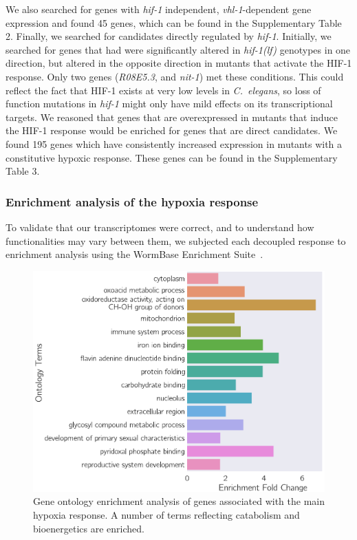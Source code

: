 \documentclass[10pt, onecolumn]{article}
\newcommand{\cel}{\emph{C.~elegans}}
\newcommand{\gene}[1]{\emph{#1}}
\newcommand{\hif}{\emph{\mbox{hif-1(lf)}}}
\newcommand{\hifp}{HIF-1}
\newcommand{\vhltargets}{45} %
\newcommand{\hiftargets}{195}
\begin{document}
We also searched for genes with \gene{hif-1} independent, \gene{vhl-1}-dependent gene
expression and found \vhltargets{} genes, which can be found in the Supplementary
Table 2.
Finally, we searched for candidates directly regulated by \gene{hif-1}. Initially, we
searched for genes that had were significantly altered in \hif{} genotypes in one
direction, but altered in the opposite direction in mutants that activate the
\hifp{} response. Only two genes (\emph{R08E5.3}, and \emph{nit-1}) met these
conditions. This could reflect the fact that \hifp{} exists at very low
levels in \cel{}, so loss of function mutations in \gene{hif-1} might only have
mild effects on its transcriptional targets. We reasoned that genes
that are overexpressed in mutants that induce the \hifp{} response would be enriched
for genes that are direct candidates.  We found \hiftargets{}  genes which have
consistently increased expression in mutants with a constitutive hypoxic response.
These genes can be found in the Supplementary Table 3.


\subsubsection*{Enrichment analysis of the hypoxia response}
\label{sub:ea_hypoxia}
To validate that our transcriptomes were correct, and to understand how
functionalities may vary between them, we subjected each decoupled response to
enrichment analysis using the WormBase Enrichment Suite~\cite{Angeles-Albores2016,
Angeles-Albores2016b}.

\begin{figure}[tbhp]
\centering
\includegraphics[width=.5\linewidth]{../figs/hypoxia_response_gea.pdf}
\caption{
Gene ontology enrichment analysis of genes associated with the main hypoxia response.
A number of terms reflecting catabolism and bioenergetics are enriched.
}
\label{fig:hyp_gea}
\end{figure}
\end{document}
